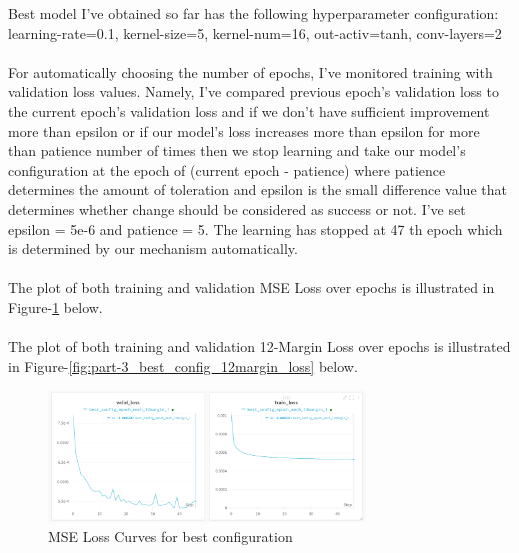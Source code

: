 \documentclass[12pt]{article}
\begin{document}
    \begin{center}
        \raggedright
        Best model I've obtained so far has the following hyperparameter configuration:
        \\
        learning-rate=0.1, kernel-size=5, kernel-num=16, out-activ=tanh, conv-layers=2
        \\~\\
        For automatically choosing the number of epochs, I've monitored training with validation loss values. Namely,
        I've compared previous epoch's validation loss to the current epoch's validation loss and
        if we don't have sufficient improvement more than epsilon or if our model's loss increases more than epsilon
        for more than patience number of times then we stop learning and take our model's configuration at the epoch of (current epoch - patience) where
        patience determines the amount of toleration and epsilon is the small difference value that determines whether change should be considered as success or not.
        I've set epsilon = 5e-6  and patience = 5. The learning has stopped at 47 th epoch which is determined by our mechanism automatically.
        \\~\\
        The plot of both training and validation MSE Loss over epochs is illustrated in Figure-\ref*{fig:part-3_best_config_mse_loss} below.
        \\~\\
        The plot of both training and validation 12-Margin Loss over epochs is illustrated in Figure-\ref*{fig:part-3_best_config_12margin_loss} below.

    \end{center}

    \begin{figure}[!htb]
        \centering
        \includegraphics[width=0.75\textwidth]{figures/best_config_loss_mse.png}
        \caption{MSE Loss Curves for best configuration}
        \label{fig:part-3_best_config_mse_loss}
    \end{figure}
    
\end{document}
